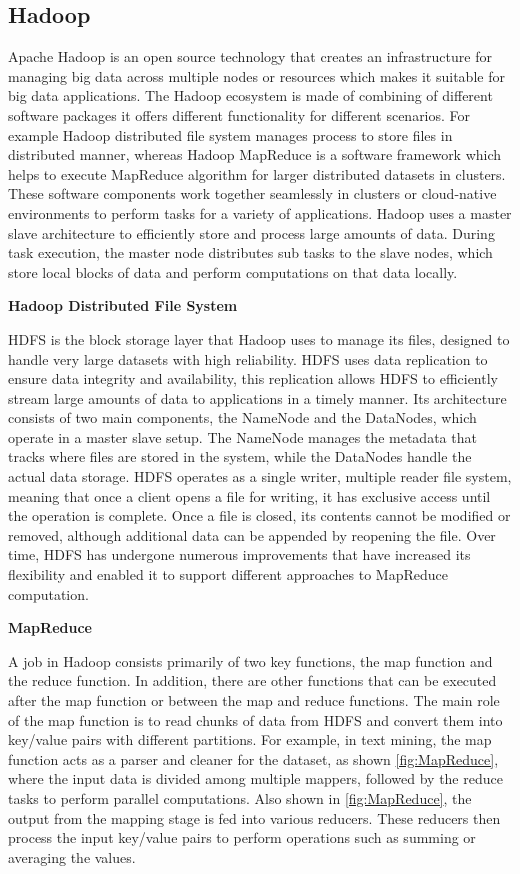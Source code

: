 \subsection{Hadoop}
Apache Hadoop is an open source technology that creates an infrastructure for managing big data across multiple nodes or resources which makes it suitable for big data applications. The
Hadoop ecosystem is made of combining of different software packages it offers different functionality for different scenarios. For example Hadoop distributed file system  manages process to store files in distributed manner, whereas Hadoop MapReduce is a software framework which helps to execute MapReduce algorithm for larger distributed datasets in clusters. These software components work together seamlessly in clusters or cloud-native environments to perform tasks for a variety of applications. Hadoop uses a master slave architecture to efficiently store and process large amounts of data. During task execution, the master node distributes sub tasks to the slave nodes, which store local blocks of data and perform computations on that data locally. \cite{ketu2020performance, sun2023survey}

\textbf{Hadoop Distributed File System}

HDFS is the block storage layer that Hadoop uses to manage its files, designed to handle very large datasets with high reliability. HDFS uses data replication to ensure data integrity and availability, this replication allows HDFS to efficiently stream large amounts of data to applications in a timely manner. Its architecture consists of two main components, the NameNode and the DataNodes, which operate in a master slave setup. The NameNode manages the metadata that tracks where files are stored in the system, while the DataNodes handle the actual data storage. HDFS operates as a single writer, multiple reader file system, meaning that once a client opens a file for writing, it has exclusive access until the operation is complete. Once a file is closed, its contents cannot be modified or removed, although additional data can be appended by reopening the file. Over time, HDFS has undergone numerous improvements that have increased its flexibility and enabled it to support different approaches to MapReduce computation. \cite{polato2014comprehensive}

\textbf{MapReduce}

A job in Hadoop consists primarily of two key functions, the map function and the reduce function. In addition, there are other functions that can be executed after the map function or between the map and reduce functions. The main role of the map function is to read chunks of data from HDFS and convert them into key/value pairs with different partitions. For example, in text mining, the map function acts as a parser and cleaner for the dataset, as shown \autoref{fig:MapReduce}, where the input data is divided among multiple mappers, followed by the reduce tasks to perform parallel computations. Also shown in \autoref{fig:MapReduce}, the output from the mapping stage is fed into various reducers. These reducers then process the input key/value pairs to perform operations such as summing or averaging the values. \cite{ketu2020performance}

